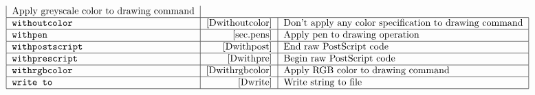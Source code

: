 \begin{table}[htp]
$$\begin{tabular}{|l|r|l|}
        Apply greyscale color to drawing command\\\hline
\tt \verb|withoutcolor|&     \pageref{Dwithoutcolor}&
        Don't apply any color specification to drawing command\\\hline
\tt \verb|withpen|&          \pageref{sec.pens}&
        Apply pen to drawing operation\\\hline
\tt \verb|withpostscript|&   \pageref{Dwithpost}&
        End raw PostScript code\\\hline
\tt \verb|withprescript|&    \pageref{Dwithpre}&
        Begin raw PostScript code\\\hline
\tt \verb|withrgbcolor|&     \pageref{Dwithrgbcolor}&
        Apply RGB color to drawing command\\\hline
\tt \verb|write to|&         \pageref{Dwrite}&
        Write string to file\\\hline
\end{tabular}
$$
%
\label{cmdtab}
\end{table}


